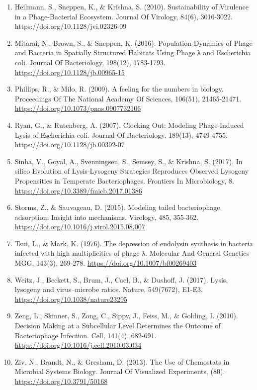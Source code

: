 \documentclass{article}
\begin{document}
\begin{enumerate}
\item	Heilmann, S., Sneppen, K., $\&$ Krishna, S. (2010). Sustainability of Virulence in a Phage-Bacterial Ecosystem. Journal Of Virology, 84(6), 3016-3022. https://doi.org/10.1128/jvi.02326-09

\item	Mitarai, N., Brown, S., $\&$ Sneppen, K. (2016). Population Dynamics of Phage and Bacteria in Spatially Structured Habitats Using Phage λ and Escherichia coli. Journal Of Bacteriology, 198(12), 1783-1793. \url{https://doi.org/10.1128/jb.00965-15}

\item	Phillips, R., $\&$ Milo, R. (2009). A feeling for the numbers in biology. Proceedings Of The National Academy Of Sciences, 106(51), 21465-21471. \url{https://doi.org/10.1073/pnas.0907732106}

\item	Ryan, G., $\&$ Rutenberg, A. (2007). Clocking Out: Modeling Phage-Induced Lysis of Escherichia coli. Journal Of Bacteriology, 189(13), 4749-4755. \url{https://doi.org/10.1128/jb.00392-07}

\item	Sinha, V., Goyal, A., Svenningsen, S., Semsey, S., $\&$ Krishna, S. (2017). In silico Evolution of Lysis-Lysogeny Strategies Reproduces Observed Lysogeny Propensities in Temperate Bacteriophages. Frontiers In Microbiology, 8. \url{https://doi.org/10.3389/fmicb.2017.01386}

\item	Storms, Z., $\&$ Sauvageau, D. (2015). Modeling tailed bacteriophage adsorption: Insight into mechanisms. Virology, 485, 355-362.
\url{https://doi.org/10.1016/j.virol.2015.08.007}

\item	Tsui, L., $\&$ Mark, K. (1976). The depression of endolysin synthesis in bacteria infected with high multiplicities of phage λ. Molecular And General Genetics MGG, 143(3), 269-278. \url{https://doi.org/10.1007/bf00269403}

\item	Weitz, J., Beckett, S., Brum, J., Cael, B., $\&$ Dushoff, J. (2017). Lysis, lysogeny and virus–microbe ratios. Nature, 549(7672), E1-E3. \url{https://doi.org/10.1038/nature23295}

\item	Zeng, L., Skinner, S., Zong, C., Sippy, J., Feiss, M., $\&$ Golding, I. (2010). Decision Making at a Subcellular Level Determines the Outcome of Bacteriophage Infection. Cell, 141(4), 682-691. \url{https://doi.org/10.1016/j.cell.2010.03.034}

\item	Ziv, N., Brandt, N., $\&$ Gresham, D. (2013). The Use of Chemostats in Microbial Systems Biology. Journal Of Visualized Experiments, (80). \url{https://doi.org/10.3791/50168}
\end{enumerate}
\end{document}
